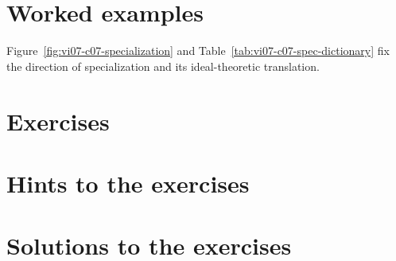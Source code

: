 \section{Worked examples}



Figure~\ref{fig:vi07-c07-specialization} and Table~\ref{tab:vi07-c07-spec-dictionary}
fix the direction of specialization and its ideal-theoretic translation.


\section{Exercises}


\ifdefined\IncludeExerciseHints
\section*{Hints to the exercises}

\fi

\ifdefined\IncludeExerciseSolutions
\section*{Solutions to the exercises}

\fi

